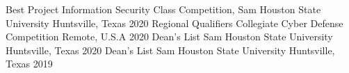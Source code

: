 \begin{cvhonors}

  \cvhonor
    {Best Project} %
    {Information Security Class Competition, Sam Houston State University} %
    {Huntsville, Texas} %
    {2020} %
  \cvhonor
    {Regional Qualifiers} %
    {Collegiate Cyber Defense Competition} %
    {Remote, U.S.A} %
    {2020} %
  \cvhonor
    {Dean's List} %
    {Sam Houston State University} %
    {Huntsville, Texas} %
    {2020} %
  \cvhonor
    {Dean's List} %
    {Sam Houston State University} %
    {Huntsville, Texas} %
    {2019} %

\end{cvhonors}
